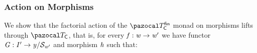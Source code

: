 \subsubsection{Action on Morphisms}

We show that the factorial action of the $\monFLSfin$ monad on morphisms lifts through $\monFLSCtx$, that is, for every $\mathit{f} : \mathit{w} \to \mathit{w}'$ we have functor $\mathit{G} : \mathit{I}' \to {\mathit{y}}/{\mathcal{S}_{\mathit{w}'}}$ and morphism $\mathit{h}$ such that: 
\begin{center}
\end{center}

